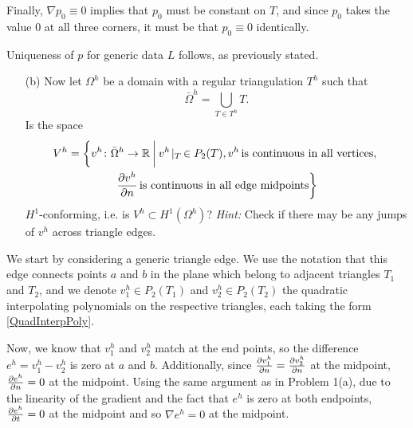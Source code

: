 \begin{problem}{1}
\begin{solution}
Finally, $\nabla{p_0} \equiv 0$ implies that $p_0$ must be constant on $T$, and since $p_0$ takes the value $0$ at all three corners, it must be that $p_0 \equiv 0$ identically.

Uniqueness of $p$ for generic data $L$ follows, as previously stated.

\end{solution}
\pagebreak

\begin{itemize}
	\item[(b)] Now let $\Omega^h$ be a domain with a regular triangulation $T^h$ such that
	$$\bar{\Omega}^h = \bigcup_{T\in T^h} T.$$
	Is the space
	\begin{gather*}
	V^h = \left\{ \vphantom{\pd{v^h}{n}}
	v^h \colon \bar{\Omega}^h \rightarrow \RR \:\middle|\:
	v^h\!\mid_T\, \in P_2(T), v^h\,\text{is continuous in all vertices},
	\right. \\ \left.
	\pd{v^h}{n}\,\text{is continuous in all edge midpoints}
	\right\}
	\end{gather*}	 
	$H^1$-conforming, i.e. is $V^h \subset H^1(\Omega^h)$?
	\textit{Hint:} Check if there may be any jumps of $v^h$ across triangle edges.
\end{itemize}

\begin{solution}
We start by considering a generic triangle edge.
We use the notation that this edge connects points $a$ and $b$ in the plane which belong to adjacent triangles $T_1$ and $T_2$, and we denote $v^h_1 \in P_2(T_1)$ and $v^h_2 \in P_2(T_2)$ the quadratic interpolating polynomials on the respective triangles, each taking the form \ref{QuadInterpPoly}.


Now, we know that $v^h_1$ and $v^h_2$ match at the end points, so the difference $e^h = v^h_1 - v^h_2$ is zero at $a$ and $b$.
Additionally, since $\frac{\partial v^h_1}{\partial n} = \frac{\partial v^h_2}{\partial n}$ at the midpoint, $\frac{\partial e^h}{\partial n} = 0$ at the midpoint. Using the same argument as in Problem 1(a), due to the linearity of the gradient and the fact that $e^h$ is zero at both endpoints, $\frac{\partial e^h}{\partial t} = 0$ at the midpoint and so $\nabla{e^h} = 0$ at the midpoint.


\end{solution}
\end{problem}
